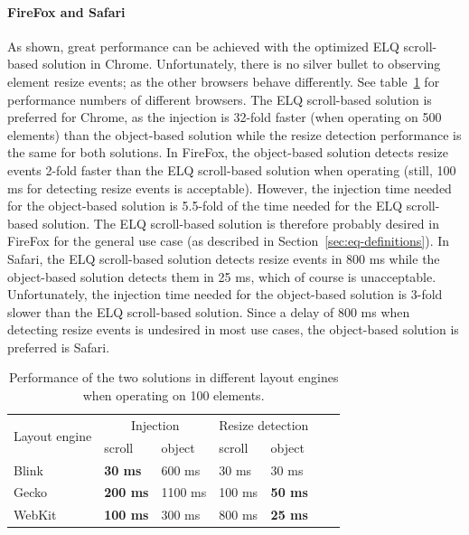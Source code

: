 \documentclass[a4paper,11pt]{kth-mag}
\begin{document}
        \paragraph{FireFox and Safari}
        As shown, great performance can be achieved with the optimized \gls{ELQ} scroll-based solution in Chrome.
        Unfortunately, there is no silver bullet to observing element resize events; as the other \glspl{browser} behave differently.
        See table~\ref{table:erd-layout-engines} for performance numbers of different \glspl{browser}.
        The \gls{ELQ} scroll-based solution is preferred for Chrome, as the injection is 32-fold faster (when operating on 500 \glspl{element}) than the object-based solution while the resize detection performance is the same for both solutions.
        In FireFox, the object-based solution detects resize events 2-fold faster than the \gls{ELQ} scroll-based solution when operating (still, 100 ms for detecting resize events is acceptable).
        However, the injection time needed for the object-based solution is 5.5-fold of the time needed for the \gls{ELQ} scroll-based solution.
        The \gls{ELQ} scroll-based solution is therefore probably desired in FireFox for the general use case (as described in Section~\ref{sec:eq-definitions}).
        In Safari, the \gls{ELQ} scroll-based solution detects resize events in 800 ms while the object-based solution detects them in 25 ms, which of course is unacceptable.
        Unfortunately, the injection time needed for the object-based solution is 3-fold slower than the \gls{ELQ} scroll-based solution.
        Since a delay of 800 ms when detecting resize events is undesired in most use cases, the object-based solution is preferred is Safari.
        \begin{table}[ht]\center
          \tiny
          \begin{tabular}[t]{ l l l l l l l }
            \multirow{2}{*}{Layout engine} & \multicolumn{2}{c}{Injection} & \multicolumn{2}{c}{Resize detection} \\
            & scroll & object & scroll & object \\
            \hline
            \gls{Blink}   & \textbf{30 ms}   & 600 ms    & 30 ms   & 30 ms           \\
            \gls{Gecko}   & \textbf{200 ms}  & 1100 ms   & 100 ms  & \textbf{50 ms}  \\
            \gls{WebKit}  & \textbf{100 ms}  & 300 ms    & 800 ms  & \textbf{25 ms}  \\
          \end{tabular}
          \caption{Performance of the two solutions in different \glspl{layout engine} when operating on 100 \glspl{element}.}
          \label{table:erd-layout-engines}
        \end{table}
\end{document}

